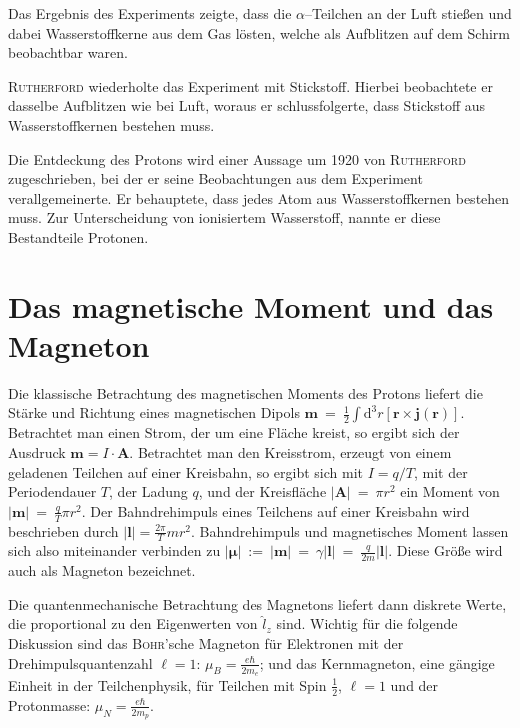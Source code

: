 \documentclass[sn-mathphys-num,iicol]{sn-jnl}
\theoremstyle{thmstyleone}
\theoremstyle{thmstyletwo}
\theoremstyle{thmstylethree}
\newcommand{\td}{\text{d}}
\begin{document}
Das Ergebnis des Experiments zeigte, dass die $\alpha $--Teilchen an der Luft stießen und dabei Wasserstoffkerne aus dem Gas lösten, welche als Aufblitzen auf dem Schirm beobachtbar waren.

\textsc{Rutherford} wiederholte das Experiment mit Stickstoff.
Hierbei beobachtete er dasselbe Aufblitzen wie bei Luft, woraus er schlussfolgerte, dass Stickstoff aus Wasserstoffkernen bestehen muss.

Die Entdeckung des Protons wird einer Aussage um 1920 von \textsc{Rutherford} zugeschrieben, bei der er seine Beobachtungen aus dem Experiment verallgemeinerte.
Er behauptete, dass jedes Atom aus Wasserstoffkernen bestehen muss.
Zur Unterscheidung von ionisiertem Wasserstoff, nannte er diese Bestandteile Protonen.\cite{Rutherford_proton_discovery}\cite{Rutherford1919}

\section{Das magnetische Moment und das Magneton}
Die klassische Betrachtung des magnetischen Moments des Protons liefert die Stärke und Richtung eines magnetischen Dipols $\boldsymbol{m}~=~\tfrac{1}{2}\int\td ^3r\left[\boldsymbol{r} \times \boldsymbol{j} \left(\boldsymbol{r} \right)\right]$.
Betrachtet man einen Strom, der um eine Fläche kreist, so ergibt sich der Ausdruck $\boldsymbol{m} =I\cdot \boldsymbol{A} $.
Betrachtet man den Kreisstrom, erzeugt von einem geladenen Teilchen auf einer Kreisbahn, so ergibt sich mit $I=q/T$, mit der Periodendauer $T$, der Ladung $q$, und der Kreisfläche $|\boldsymbol{A} |~=~\pi r^2$ ein Moment von $|\boldsymbol{m} |~=~\tfrac{q}{T}\pi r^2$.
Der Bahndrehimpuls eines Teilchens auf einer Kreisbahn wird beschrieben durch $|\boldsymbol{l} |=\tfrac{2\pi }{T}mr^2$.
Bahndrehimpuls und magnetisches Moment lassen sich also miteinander verbinden zu $|\boldsymbol{\mu } |~:=~|\boldsymbol{m} |~=~\gamma |\boldsymbol{l} |~=~\tfrac{q}{2m}|\boldsymbol{l} |$.
Diese Größe wird auch als Magneton bezeichnet.

Die quantenmechanische Betrachtung des Magnetons liefert dann diskrete Werte, die proportional zu den Eigenwerten von $\hat{l}_z$ sind.
Wichtig für die folgende Diskussion sind das \textsc{Bohr}'sche Magneton für Elektronen mit der Drehimpulsquantenzahl $\ell=1$: $\mu _B=\tfrac{e\hbar }{2m_e}$; und das Kernmagneton, eine gängige Einheit in der Teilchenphysik, für Teilchen mit Spin $\tfrac{1}{2}$, $\ell=1$ und der Protonmasse: $\mu _N=\tfrac{e\hbar }{2m_p}$.
\end{document}
